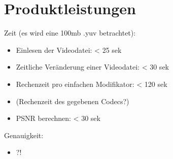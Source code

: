 \section{Produktleistungen}

Zeit (es wird eine 100mb .yuv betrachtet):
\begin{itemize}
	\item Einlesen der Videodatei: < 25 sek
	\item Zeitliche Veränderung einer Videodatei: < 30 sek 
	\item Rechenzeit pro einfachen Modifikator: < 120 sek
	\item (Rechenzeit des gegebenen Codecs?) 
	\item PSNR berechnen: < 30 sek
\end{itemize}

Genauigkeit:
\begin{itemize}
	\item ?!
\end{itemize}